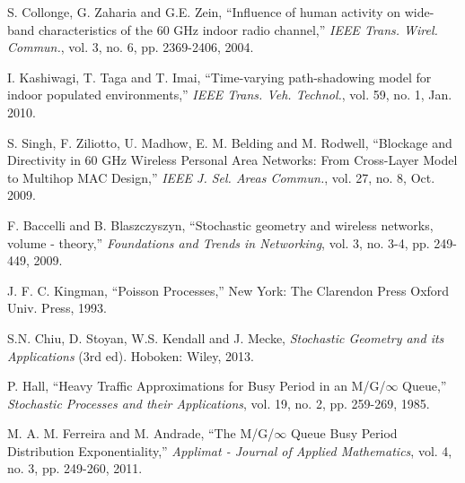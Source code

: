 \documentclass[10pt, conference, letterpaper]{IEEEtran}
\newcommand*{\Rom}[1]{\uppercase\expandafter{\romannumeral #1\relax}} %
\begin{document}
\begin{thebibliography}{50}

S. Collonge, G. Zaharia and G.E. Zein, ``Influence of human activity on wide-band characteristics of the 60 GHz indoor radio channel,'' \emph{IEEE Trans. Wirel. Commun.}, vol. 3,  no. 6, pp. 2369-2406, 2004.

I. Kashiwagi, T. Taga and T. Imai, ``Time-varying path-shadowing model for indoor populated environments,'' \emph{IEEE Trans. Veh. Technol.}, vol. 59, no. 1, Jan. 2010.

S. Singh, F. Ziliotto, U. Madhow, E. M. Belding and M. Rodwell, ``Blockage and Directivity in 60 GHz Wireless Personal Area Networks: From Cross-Layer Model to Multihop MAC Design,'' \emph{IEEE J. Sel. Areas Commun.}, vol. 27, no. 8, Oct. 2009.

F. Baccelli and B. Blaszczyszyn, ``Stochastic geometry and wireless networks, volume \Rom{1} - theory,'' \emph{Foundations and Trends in Networking}, vol. 3, no. 3-4, pp. 249-449, 2009.

J. F. C. Kingman, ``Poisson Processes,'' New York: The Clarendon Press Oxford Univ. Press, 1993.

S.N. Chiu, D. Stoyan, W.S. Kendall and J. Mecke, \emph{Stochastic Geometry and its Applications} (3rd ed). Hoboken: Wiley, 2013. 

P. Hall, ``Heavy Traffic Approximations for Busy Period in an M/G/$\infty$ Queue,'' \emph{Stochastic Processes and their Applications}, vol. 19, no. 2, pp. 259-269, 1985.

M. A. M. Ferreira and M. Andrade, ``The M/G/$\infty$ Queue Busy Period Distribution Exponentiality,'' \emph{Applimat - Journal of Applied Mathematics}, vol. 4, no. 3, pp. 249-260, 2011.


\end{thebibliography}
\end{document}
